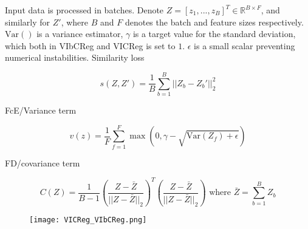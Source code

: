 \documentclass[../../thesis.tex]{subfiles}
\begin{document}
Input data is processed in batches. Denote $Z = [z_1,...,z_B]^T \in \mathbb{R}^{B\times F}$, and similarly for $Z'$, where $B$ and $F$ denotes the batch and feature sizes respectively. $\text{Var}()$ is a variance estimator, $\gamma$ is a target value for the standard deviation, which both in VIbCReg and VICReg is set to $1$. $\epsilon$ is a small scalar preventing numerical instabilities.\newline 
Similarity loss

\begin{equation}
    s(Z,Z') = \frac{1}{B} \sum_{b=1}^B || Z_b-Z_b'||_2^2
\end{equation}

FcE/Variance term

\begin{equation}
    v(z) =  \frac{1}{F} \sum_{f=1}^F \max(0,\gamma - \sqrt{\text{Var}(Z_f)+\epsilon})
\end{equation}


FD/covariance term

\begin{equation}
    C(Z) = \frac{1}{B-1} \left(\frac{Z-\bar{Z}}{||Z-\bar{Z}||_2}\right)^T\left(\frac{Z-\bar{Z}}{||Z-\bar{Z}||_2}\right) \text{ where }  \bar{Z} = \sum_{b=1}^B  Z_b
\end{equation}

\begin{figure}[h]
    \texttt{[image: VICReg\_VIbCReg.png]}
    \centering    
    \caption{\cite{lee2024vibcreg}}
\end{figure}
\end{document}
